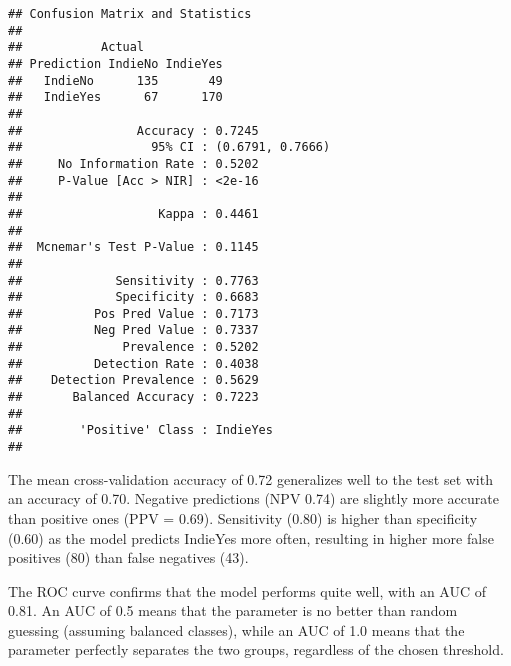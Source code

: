 \documentclass[
]{article}
\newenvironment{Shaded}{\begin{snugshade}}{\end{snugshade}}
\newcommand{\AttributeTok}[1]{\textcolor[rgb]{0.13,0.29,0.53}{#1}}
\newcommand{\CommentTok}[1]{\textcolor[rgb]{0.56,0.35,0.01}{\textit{#1}}}
\newcommand{\FunctionTok}[1]{\textcolor[rgb]{0.13,0.29,0.53}{\textbf{#1}}}
\newcommand{\NormalTok}[1]{#1}
\newcommand{\OtherTok}[1]{\textcolor[rgb]{0.56,0.35,0.01}{#1}}
\newcommand{\SpecialCharTok}[1]{\textcolor[rgb]{0.81,0.36,0.00}{\textbf{#1}}}
\newcommand{\StringTok}[1]{\textcolor[rgb]{0.31,0.60,0.02}{#1}}
\begin{document}
\begin{Shaded}
\end{Shaded}

\begin{verbatim}
## Confusion Matrix and Statistics
## 
##           Actual
## Prediction IndieNo IndieYes
##   IndieNo      135       49
##   IndieYes      67      170
##                                           
##                Accuracy : 0.7245          
##                  95% CI : (0.6791, 0.7666)
##     No Information Rate : 0.5202          
##     P-Value [Acc > NIR] : <2e-16          
##                                           
##                   Kappa : 0.4461          
##                                           
##  Mcnemar's Test P-Value : 0.1145          
##                                           
##             Sensitivity : 0.7763          
##             Specificity : 0.6683          
##          Pos Pred Value : 0.7173          
##          Neg Pred Value : 0.7337          
##              Prevalence : 0.5202          
##          Detection Rate : 0.4038          
##    Detection Prevalence : 0.5629          
##       Balanced Accuracy : 0.7223          
##                                           
##        'Positive' Class : IndieYes        
## 
\end{verbatim}

The mean cross-validation accuracy of 0.72 generalizes well to the test
set with an accuracy of 0.70. Negative predictions (NPV 0.74) are
slightly more accurate than positive ones (PPV = 0.69). Sensitivity
(0.80) is higher than specificity (0.60) as the model predicts IndieYes
more often, resulting in higher more false positives (80) than false
negatives (43).

The ROC curve confirms that the model performs quite well, with an AUC
of 0.81. An AUC of 0.5 means that the parameter is no better than random
guessing (assuming balanced classes), while an AUC of 1.0 means that the
parameter perfectly separates the two groups, regardless of the chosen
threshold.
\end{document}
